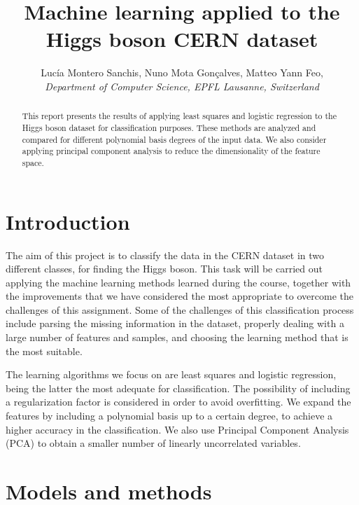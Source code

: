 \documentclass[10pt,conference,compsocconf]{IEEEtran}
\begin{document}
\title{Machine learning applied to the Higgs boson CERN dataset}

\author{
  Luc\'{i}a Montero Sanchis, Nuno Mota Gon\c{c}alves, Matteo Yann Feo,  \\
  \textit{Department of Computer Science, EPFL Lausanne, Switzerland}
}

\maketitle

\begin{abstract}
  This report presents the results of applying least squares and logistic regression to the Higgs boson dataset for classification purposes. These methods are analyzed and compared for different polynomial basis degrees of the input data. We also consider applying principal component analysis to reduce the dimensionality of the feature space.
\end{abstract}

\section{Introduction}
	The aim of this project is to classify the data in the CERN dataset in two different classes, for finding the Higgs boson. This task will be carried out applying the machine learning methods learned during the course, together with the improvements that we have considered the most appropriate to overcome the challenges of this assignment. Some of the challenges of this classification process include parsing the missing information in the dataset, properly dealing with a large number of features and samples, and choosing the learning method that is the most suitable.

	The learning algorithms we focus on are least squares and logistic regression, being the latter the most adequate for classification. The possibility of including a regularization factor is considered in order to avoid overfitting. We expand the features by including a polynomial basis up to a certain degree, to achieve a higher accuracy in the classification. We also use Principal Component Analysis (PCA) to obtain a smaller number of linearly uncorrelated variables.


\section{Models and methods}
	\label{sec:models-methods}
\end{document}
